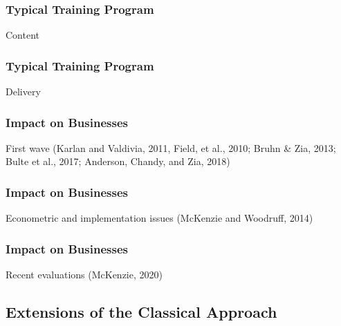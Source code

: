 \documentclass[hideothersubsections, usenames,dvipsnames,10pt]{beamer}
\newenvironment{itemize_3pt}{\itemize\addtolength{\itemsep}{3pt}}{\enditemize}
\begin{document}

\begin{frame}
\frametitle{Typical Training Program}
	\begin{itemize_3pt}
	\item Content %
	\vspace{0.1in}
	\end{itemize_3pt}
\end{frame}

\begin{frame}
\frametitle{Typical Training Program}
	\begin{itemize_3pt}
	\item Delivery %
	\vspace{0.1in}
	\end{itemize_3pt}
\end{frame}


\begin{frame}
\frametitle{Impact on Businesses}
	\begin{itemize_3pt}
	\item First wave (Karlan and Valdivia, 2011, Field, et al., 2010; Bruhn \& Zia, 2013; Bulte et al., 2017; Anderson, Chandy, and Zia, 2018)
	\vspace{0.1in}
	\end{itemize_3pt}
\end{frame}

\begin{frame}
\frametitle{Impact on Businesses}
	\begin{itemize_3pt}
	\item Econometric and implementation issues (McKenzie and Woodruff, 2014)
	\vspace{0.1in}
	\end{itemize_3pt}
\end{frame}

\begin{frame}
\frametitle{Impact on Businesses}
	\begin{itemize_3pt}
	\item Recent evaluations (McKenzie, 2020)
	\vspace{0.1in}
	\end{itemize_3pt}
\end{frame}


\subsection{Extensions of the Classical Approach}
\end{document}
